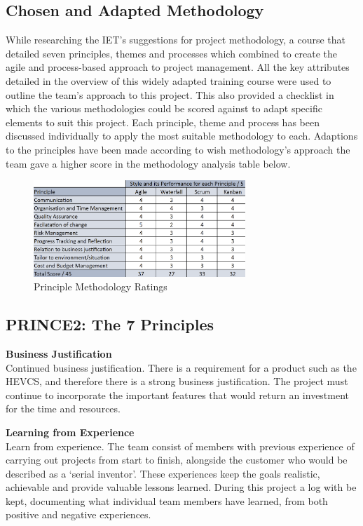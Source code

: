 \documentclass [12pt]{article}
\begin{document}
\subsection{Chosen and Adapted Methodology}\label{sec:chosen_methodology}
While researching the IET’s suggestions for project methodology, a course that detailed seven principles, themes and processes which combined to create the \cite{PRINCE2} agile and process-based approach to project management. All the key attributes detailed in the overview of this widely adapted training course were used to outline the team's approach to this project. This also provided a checklist in which the various methodologies could be scored against to adapt specific elements to suit this project. Each principle, theme and process has been discussed individually to apply the most suitable methodology to each. Adaptions to the principles have been made according to wish methodology's approach the team gave a higher score in the methodology analysis table below.

\begin{figure}[h]
    \centering
    \includegraphics[width = 8cm]{PrincipleMethodologyRating.png}
    \caption{Principle Methodology Ratings}
\end{figure}

\subsection{PRINCE2: The 7 Principles}\label{sec:7_principles}

\textbf{Business Justification} \\
Continued business justification. There is a requirement for a product such as the HEVCS, and therefore there is a strong business justification. The project must continue to incorporate the important features that would return an investment for the time and resources.

\textbf{Learning from Experience} \\
Learn from experience. The team consist of members with previous experience of carrying out projects from start to finish, alongside the customer who would be described as a ‘serial inventor’. These experiences keep the goals realistic, achievable and provide valuable lessons learned. During this project a log with be kept, documenting what individual team members have learned, from both positive and negative experiences.
\end{document}
